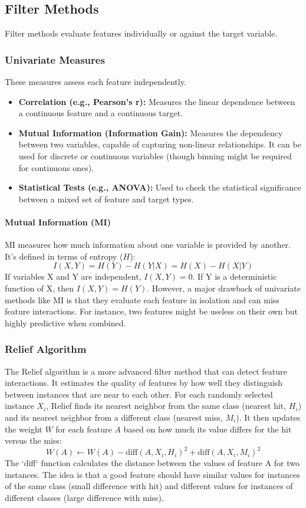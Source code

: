 \documentclass{article}
\begin{document}
\begin{multicols}{2}
	\subsection{Filter Methods}
	Filter methods evaluate features individually or against the target variable.

	\subsubsection{Univariate Measures}
	These measures assess each feature independently.
	\begin{itemize}
		\item \textbf{Correlation (e.g., Pearson's r):} Measures the linear dependence between a continuous feature and a continuous target.
		\item \textbf{Mutual Information (Information Gain):} Measures the dependency between two variables, capable of capturing non-linear relationships. It can be used for discrete or continuous variables (though binning might be required for continuous ones).
		\item \textbf{Statistical Tests (e.g., ANOVA):} Used to check the statistical significance between a mixed set of feature and target types.
	\end{itemize}

	\paragraph{Mutual Information (MI)}
	MI measures how much information about one variable is provided by another. It's defined in terms of entropy ($H$):
	$$ I(X, Y) = H(Y) - H(Y|X) = H(X) - H(X|Y) $$
	If variables X and Y are independent, $I(X,Y) = 0$. If Y is a deterministic function of X, then $I(X,Y) = H(Y)$. However, a major drawback of univariate methods like MI is that they evaluate each feature in isolation and can miss feature interactions. For instance, two features might be useless on their own but highly predictive when combined.

	\subsubsection{Relief Algorithm}
	The Relief algorithm is a more advanced filter method that can detect feature interactions. It estimates the quality of features by how well they distinguish between instances that are near to each other. For each randomly selected instance $X_i$, Relief finds its nearest neighbor from the same class (nearest hit, $H_i$) and its nearest neighbor from a different class (nearest miss, $M_i$). It then updates the weight $W$ for each feature $A$ based on how much its value differs for the hit versus the miss:
	$$ W(A) \leftarrow W(A) - \text{diff}(A, X_i, H_i)^2 + \text{diff}(A, X_i, M_i)^2 $$
	The `diff` function calculates the distance between the values of feature A for two instances. The idea is that a good feature should have similar values for instances of the same class (small difference with hit) and different values for instances of different classes (large difference with miss).


\end{multicols}
\end{document}
